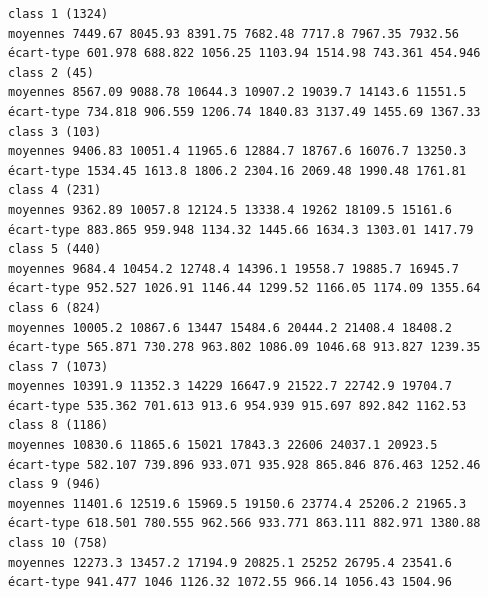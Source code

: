 \documentclass[environments,article,submit,pdftex,moreauthors]{Definitions/mdpi}
\begin{document}
\begin{scriptsize}
\begin{verbatim}
class 1 (1324)
moyennes 7449.67 8045.93 8391.75 7682.48 7717.8 7967.35 7932.56
écart-type 601.978 688.822 1056.25 1103.94 1514.98 743.361 454.946
class 2 (45)
moyennes 8567.09 9088.78 10644.3 10907.2 19039.7 14143.6 11551.5
écart-type 734.818 906.559 1206.74 1840.83 3137.49 1455.69 1367.33
class 3 (103)
moyennes 9406.83 10051.4 11965.6 12884.7 18767.6 16076.7 13250.3
écart-type 1534.45 1613.8 1806.2 2304.16 2069.48 1990.48 1761.81
class 4 (231)
moyennes 9362.89 10057.8 12124.5 13338.4 19262 18109.5 15161.6
écart-type 883.865 959.948 1134.32 1445.66 1634.3 1303.01 1417.79
class 5 (440)
moyennes 9684.4 10454.2 12748.4 14396.1 19558.7 19885.7 16945.7
écart-type 952.527 1026.91 1146.44 1299.52 1166.05 1174.09 1355.64
class 6 (824)
moyennes 10005.2 10867.6 13447 15484.6 20444.2 21408.4 18408.2
écart-type 565.871 730.278 963.802 1086.09 1046.68 913.827 1239.35
class 7 (1073)
moyennes 10391.9 11352.3 14229 16647.9 21522.7 22742.9 19704.7
écart-type 535.362 701.613 913.6 954.939 915.697 892.842 1162.53
class 8 (1186)
moyennes 10830.6 11865.6 15021 17843.3 22606 24037.1 20923.5
écart-type 582.107 739.896 933.071 935.928 865.846 876.463 1252.46
class 9 (946)
moyennes 11401.6 12519.6 15969.5 19150.6 23774.4 25206.2 21965.3
écart-type 618.501 780.555 962.566 933.771 863.111 882.971 1380.88
class 10 (758)
moyennes 12273.3 13457.2 17194.9 20825.1 25252 26795.4 23541.6
écart-type 941.477 1046 1126.32 1072.55 966.14 1056.43 1504.96


\end{verbatim}
\end{scriptsize}
\end{document}

